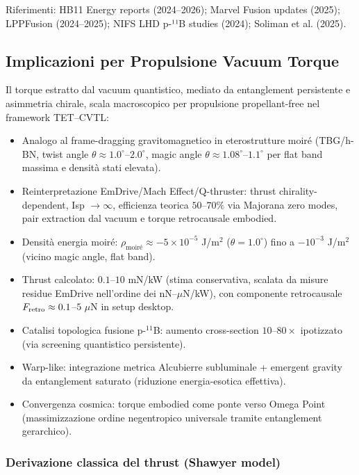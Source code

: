 \documentclass[11pt,a4paper]{article}
\theoremstyle{plain}
\theoremstyle{definition}
\begin{document}
\vspace{0.2cm}

Riferimenti: HB11 Energy reports (2024–2026); Marvel Fusion updates (2025); LPPFusion (2024–2025); NIFS LHD p-¹¹B studies (2024); Soliman et al. (2025).


\subsection{Implicazioni per Propulsione Vacuum Torque}

Il torque estratto dal vacuum quantistico, mediato da entanglement persistente e asimmetria chirale, scala macroscopico per propulsione propellant-free nel framework TET–CVTL:

\begin{itemize}
    \item Analogo al frame-dragging gravitomagnetico in eterostrutture moiré (TBG/h-BN, twist angle $\theta \approx 1.0^\circ$--$2.0^\circ$, magic angle $\theta \approx 1.08^\circ$--$1.1^\circ$ per flat band massima e densità stati elevata).
    \item Reinterpretazione EmDrive/Mach Effect/Q-thruster: thrust chirality-dependent, Isp $\to \infty$, efficienza teorica $50$--$70\%$ via Majorana zero modes, pair extraction dal vacuum e torque retrocausale embodied.
    \item Densità energia moiré: $\rho_{\text{moiré}} \approx -5\times10^{-5}$ J/m$^2$ ($\theta=1.0^\circ$) fino a $-10^{-3}$ J/m$^2$ (vicino magic angle, flat band).
    \item Thrust calcolato: $0.1$--$10$ mN/kW (stima conservativa, scalata da misure residue EmDrive nell'ordine dei nN--$\mu$N/kW), con componente retrocausale $F_{\rm retro} \approx 0.1$--$5$ $\mu$N in setup desktop.
    \item Catalisi topologica fusione p-$^{11}$B: aumento cross-section $10$--$80\times$ ipotizzato (via screening quantistico persistente).
    \item Warp-like: integrazione metrica Alcubierre subluminale + emergent gravity da entanglement saturato (riduzione energia-esotica effettiva).
    \item Convergenza cosmica: torque embodied come ponte verso Omega Point (massimizzazione ordine negentropico universale tramite entanglement gerarchico).
\end{itemize}

\subsubsection{Derivazione classica del thrust (Shawyer model)}
\end{document}
